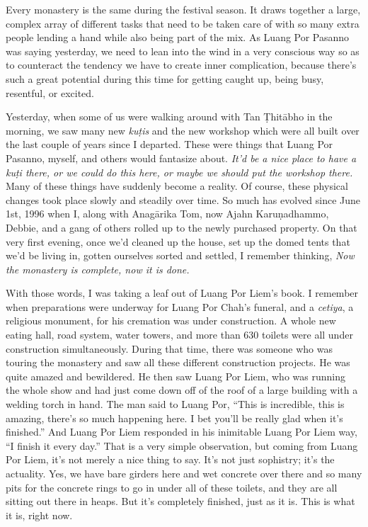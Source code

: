 Every monastery is the same during the festival season. It draws 
together a large, complex array of different tasks that need to be 
taken care of with so many extra people lending a hand while also being 
part of the mix. As Luang Por Pasanno was saying yesterday, we need to 
lean into the wind in a very conscious way so as to counteract the 
tendency we have to create inner complication, because there's such a 
great potential during this time for getting caught up, being busy, 
resentful, or excited.

Yesterday, when some of us were walking around with Tan Ṭhitābho in 
the morning, we saw many new \emph{kuṭis} and the new workshop which 
were all built over the last couple of years since I departed. These 
were things that Luang Por Pasanno, myself, and others would fantasize 
about. \emph{It'd be a nice place to have a kuṭi there, or we could 
do this here, or maybe we should put the workshop there.} Many of these 
things have suddenly become a reality. Of course, these physical 
changes took place slowly and steadily over time. So much has evolved 
since June 1st, 1996 when I, along with Anagārika Tom, now Ajahn 
Karuṇadhammo, Debbie, and a gang of others rolled up to the newly 
purchased property. On that very first evening, once we'd cleaned up 
the house, set up the domed tents that we'd be living in, gotten 
ourselves sorted and settled, I remember thinking, \emph{Now the 
monastery is complete, now it is done.}

With those words, I was taking a leaf out of Luang Por Liem's book. I 
remember when preparations were underway for Luang Por Chah's funeral, 
and a \emph{cetiya}, a religious monument, for his cremation was under 
construction. A whole new eating hall, road system, water towers, and 
more than 630 toilets were all under construction simultaneously. 
During that time, there was someone who was touring the monastery and 
saw all these different construction projects. He was quite amazed and 
bewildered. He then saw Luang Por Liem, who was running the whole show 
and had just come down off of the roof of a large building with a 
welding torch in hand. The man said to Luang Por, ``This is incredible, 
this is amazing, there's so much happening here. I bet you'll be really 
glad when it's finished.'' And Luang Por Liem responded in his 
inimitable Luang Por Liem way, ``I finish it every day.'' That is a 
very simple observation, but coming from Luang Por Liem, it's not 
merely a nice thing to say. It's not just sophistry; it's the 
actuality. Yes, we have bare girders here and wet concrete over there 
and so many pits for the concrete rings to go in under all of these 
toilets, and they are all sitting out there in heaps. But it's 
completely finished, just as it is. This is what it is, right now.

